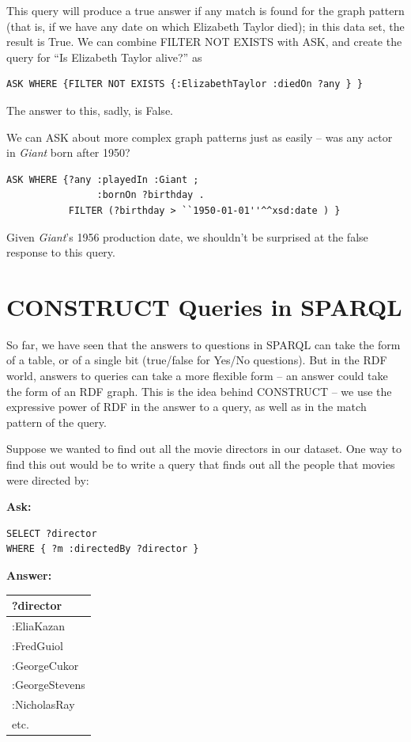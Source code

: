 This query will produce a true answer if any match is found for the
graph pattern (that is, if we have any date on which Elizabeth Taylor
died); in this data set, the result is True. We can combine FILTER NOT
EXISTS with ASK, and create the query for ``Is Elizabeth Taylor alive?''
as

\begin{lstlisting}
ASK WHERE {FILTER NOT EXISTS {:ElizabethTaylor :diedOn ?any } }
\end{lstlisting}

The answer to this, sadly, is False.

We can ASK about more complex graph patterns just as easily -- was any
actor in \emph{Giant} born after  1950?

\begin{lstlisting}
ASK WHERE {?any :playedIn :Giant ;
                :bornOn ?birthday .
           FILTER (?birthday > ``1950-01-01''^^xsd:date ) }
\end{lstlisting}

Given \emph{Giant}'s 1956 production date, we shouldn't be surprised at
the false response to this query.

\section{CONSTRUCT Queries in SPARQL}

So far, we have seen that the answers to questions in SPARQL can take
the form of a table, or of a single bit (true/false for Yes/No
questions). But in the RDF world, answers to queries can take a more
flexible form -- an answer could take the form of an RDF graph. This is
the idea behind CONSTRUCT -- we use the expressive power of RDF in the
answer to a query, as well as in the match pattern of the query.

Suppose we wanted to find out all the movie directors in our dataset.
One way to find this out would be to write a query that finds out all
the people that movies were directed by:

\textbf{\textbf{Ask:}}

\begin{lstlisting}
SELECT ?director
WHERE { ?m :directedBy ?director }
\end{lstlisting}

\textbf{\textbf{Answer:}}

\begin{tabular}{|l|}
\hline
?director\\
\hline
:EliaKazan\\
:FredGuiol\\
:GeorgeCukor\\
:GeorgeStevens\\
:NicholasRay\\
etc.\\
\hline
\end{tabular}

